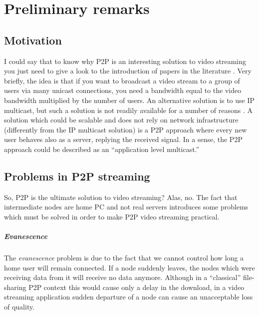 \documentclass{medusabook}
\begin{document}
\chapter{Preliminary remarks}


\section{Motivation}
\label{sub:1.0;medusa_book}

I could say that to know why P2P is an interesting solution to video
streaming you just need to give a look to the introduction of papers
in the literature \cite{deshpande01:_live_media_p2p} \cite{Octoshape}
\cite{hei08:_iptv_p2p} \cite{liu08:p2p}.  Very
briefly, the idea is that if you want to broadcast a video stream to a
group of users via many unicast connections, you need a bandwidth
equal to the video bandwidth multiplied by the number of users.  An
alternative solution is to use IP multicast, but such a solution is
not readily available for a number of reasons \cite{liu08:p2p}.  A
solution which could be scalable and does not rely on network
infrastructure (differently from the IP multicast solution) is a P2P
approach where every new user behaves also as a server, replying the
received signal.  In a sense, the P2P approach could be described as
an ``application level multicast.''


\section{Problems in P2P streaming}
\label{sub:1.1;medusa_book}

So, P2P is the ultimate solution to video streaming? Alas, no.  The
fact that intermediate nodes are home PC and not real servers
introduces some problems which must be solved in order to make P2P
video streaming practical.

\paragraph{Evanescence}
The \emph{evanescence} problem is due to the fact that we cannot
control how long a home user will remain connected.  If a node
suddenly leaves, the nodes which were receiving data from it will
receive no data anymore.  Although in a ``classical'' file-sharing P2P
context this would cause only a delay in the download, in a video
streaming application sudden departure of a node can cause an
unacceptable loss of quality.
\end{document}
